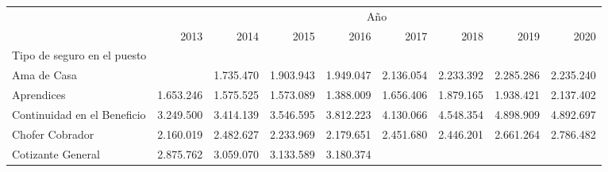 \begin{tabular}{lllllllll}
\cline{1-9}
\multicolumn{1}{c}{} &
  \multicolumn{8}{|c}{Año} \\
\multicolumn{1}{c}{} &
  \multicolumn{1}{|r}{2013} &
  \multicolumn{1}{r}{2014} &
  \multicolumn{1}{r}{2015} &
  \multicolumn{1}{r}{2016} &
  \multicolumn{1}{r}{2017} &
  \multicolumn{1}{r}{2018} &
  \multicolumn{1}{r}{2019} &
  \multicolumn{1}{r}{2020} \\
\cline{1-9}
\multicolumn{1}{l}{Tipo de seguro en el puesto} &
  \multicolumn{1}{|r}{} &
  \multicolumn{1}{r}{} &
  \multicolumn{1}{r}{} &
  \multicolumn{1}{r}{} &
  \multicolumn{1}{r}{} &
  \multicolumn{1}{r}{} &
  \multicolumn{1}{r}{} &
  \multicolumn{1}{r}{} \\
\multicolumn{1}{l}{\hspace{1em}Ama de Casa} &
  \multicolumn{1}{|r}{} &
  \multicolumn{1}{r}{1.735.470} &
  \multicolumn{1}{r}{1.903.943} &
  \multicolumn{1}{r}{1.949.047} &
  \multicolumn{1}{r}{2.136.054} &
  \multicolumn{1}{r}{2.233.392} &
  \multicolumn{1}{r}{2.285.286} &
  \multicolumn{1}{r}{2.235.240} \\
\multicolumn{1}{l}{\hspace{1em}Aprendices} &
  \multicolumn{1}{|r}{1.653.246} &
  \multicolumn{1}{r}{1.575.525} &
  \multicolumn{1}{r}{1.573.089} &
  \multicolumn{1}{r}{1.388.009} &
  \multicolumn{1}{r}{1.656.406} &
  \multicolumn{1}{r}{1.879.165} &
  \multicolumn{1}{r}{1.938.421} &
  \multicolumn{1}{r}{2.137.402} \\
\multicolumn{1}{l}{\hspace{1em}Continuidad en el Beneficio} &
  \multicolumn{1}{|r}{3.249.500} &
  \multicolumn{1}{r}{3.414.139} &
  \multicolumn{1}{r}{3.546.595} &
  \multicolumn{1}{r}{3.812.223} &
  \multicolumn{1}{r}{4.130.066} &
  \multicolumn{1}{r}{4.548.354} &
  \multicolumn{1}{r}{4.898.909} &
  \multicolumn{1}{r}{4.892.697} \\
\multicolumn{1}{l}{\hspace{1em}Chofer Cobrador} &
  \multicolumn{1}{|r}{2.160.019} &
  \multicolumn{1}{r}{2.482.627} &
  \multicolumn{1}{r}{2.233.969} &
  \multicolumn{1}{r}{2.179.651} &
  \multicolumn{1}{r}{2.451.680} &
  \multicolumn{1}{r}{2.446.201} &
  \multicolumn{1}{r}{2.661.264} &
  \multicolumn{1}{r}{2.786.482} \\
\multicolumn{1}{l}{\hspace{1em}Cotizante General} &
  \multicolumn{1}{|r}{2.875.762} &
  \multicolumn{1}{r}{3.059.070} &
  \multicolumn{1}{r}{3.133.589} &
  \multicolumn{1}{r}{3.180.374} &

\end{tabular}
